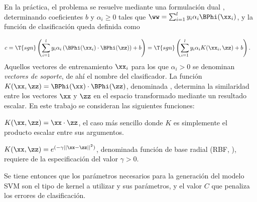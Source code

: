 En la práctica, el problema se resuelve mediante una formulación
dual \cite{bottou}, determinando
coeficientes $b$ y $\alpha_i\geq0$ tales que $\ww=\sum_{i=1}^l
y_i\alpha_i\BPhi(\xx_i)$, y la función de clasificación queda
definida como

\begin{align}
  c &= \T{sgn}\left(\sum_{i=1}^l
  y_i\alpha_i\left(\BPhi(\xx_i)\cdot\BPhi(\zz)\right)+b\right) =
  \T{sgn}\left(\sum_{i=1}^l y_i\alpha_iK(\xx_i,\zz)+b\right).
\end{align}
Aquellos vectores de entrenamiento $\xx_i$ para los que $\alpha_i >
0$ se denominan \emph{vectores de soporte}, de ahí el nombre del
clasificador.  La función
$K(\xx,\zz)=\BPhi(\xx)\cdot\BPhi(\zz)$, denominada
, determina la similaridad entre los vectores $\xx$ y
$\zz$ en el espacio transformado mediante un resultado escalar. En
este trabajo se consideran las siguientes funciones:

\begin{description}
  [style=sameline,leftmargin=5cm,itemsep=6pt,align=right]
  \item[Lineal:] $K(\xx,\zz)=\xx\cdot\zz$, el caso
    más sencillo donde $K$ es simplemente el producto escalar entre
    sus argumentos.
\item[RBF:] $K(\xx,\zz)=e^{(-\gamma||\xx-\zz||^2)}$,
  denominada función de base radial (RBF, ), requiere de la especificación del valor $\gamma>0$.
\end{description}
Se tiene entonces que los parámetros necesarios para la generación del
modelo SVM son el tipo de kernel a utilizar y sus parámetros, y el
valor $C$ que penaliza los errores de clasificación.